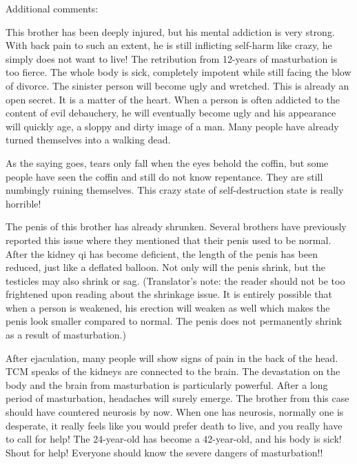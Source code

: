 \documentclass[
]{book}
\begin{document}
Additional comments:

This brother has been deeply injured, but his mental addiction is very strong. With back pain to such an extent, he is still inflicting self-harm like crazy, he simply does not want to live! The retribution from 12-years of masturbation is too fierce. The whole body is sick, completely impotent while still facing the blow of divorce. The sinister person will become ugly and wretched. This is already an open secret. It is a matter of the heart. When a person is often addicted to the content of evil debauchery, he will eventually become ugly and his appearance will quickly age, a sloppy and dirty image of a man. Many people have already turned themselves into a walking dead.

As the saying goes, tears only fall when the eyes behold the coffin, but some people have seen the coffin and still do not know repentance. They are still numbingly ruining themselves. This crazy state of self-destruction state is really horrible!

The penis of this brother has already shrunken. Several brothers have previously reported this issue where they mentioned that their penis used to be normal. After the kidney qi has become deficient, the length of the penis has been reduced, just like a deflated balloon. Not only will the penis shrink, but the testicles may also shrink or sag. (Translator's note: the reader should not be too frightened upon reading about the shrinkage issue. It is entirely possible that when a person is weakened, his erection will weaken as well which makes the penis look smaller compared to normal. The penis does not permanently shrink as a result of masturbation.)

After ejaculation, many people will show signs of pain in the back of the head. TCM speaks of the kidneys are connected to the brain. The devastation on the body and the brain from masturbation is particularly powerful. After a long period of masturbation, headaches will surely emerge. The brother from this case should have countered neurosis by now. When one has neurosis, normally one is desperate, it really feels like you would prefer death to live, and you really have to call for help! The 24-year-old has become a 42-year-old, and his body is sick! Shout for help! Everyone should know the severe dangers of masturbation!!
\end{document}
